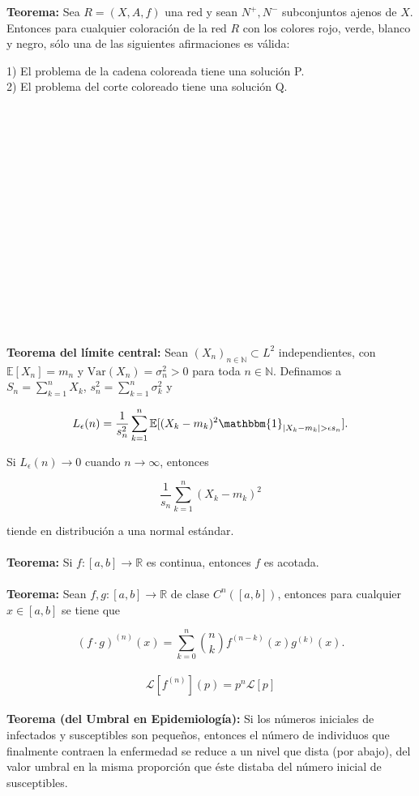 \documentclass[a4paper,11pt, twocolumn]{article}
\newcommand{\NN}{\mathbb{N}}
\newcommand{\EE}{\mathbb{E}}
\newcommand{\RR}{\mathbb{R}}
\newcommand{\Ll}{\mathcal{L}}
\newcommand{\1}{\mathbbm{1}}
\begin{document}
\textbf{Teorema:} Sea $R=(X,A,f)$ una red y sean $N^+,N^-$ subconjuntos ajenos de $X$. Entonces para cualquier coloración de la red $R$ con los colores rojo, verde, blanco y negro, sólo una de las siguientes afirmaciones es válida:

1) El problema de la cadena coloreada tiene una solución P.\\
2) El problema del corte coloreado tiene una solución Q.\\\\\\\\\\\\\\\\\\\\\\\\\\\\\\\


\textbf{Teorema del límite central:} Sean $(X_n)_{n\in\NN}\subset L^2$ independientes, con $\EE[X_n]=m_n$ y $\mathrm{Var}(X_n)=\sigma_n^2>0$ para toda $n\in\NN$. Definamos a $S_n = \sum_{k=1}^n X_k$, $s_n^2 = \sum_{k=1}^n \sigma^2_k$ y  

\[L_\epsilon (n) = \dfrac{1}{s_n^2}\sum_{k=1}^n\EE[(X_k-m_k)^2\1_{|X_k-m_k|>\epsilon s_n}].\]

Si $L_\epsilon (n)\rightarrow 0$ cuando $n\to \infty$, entonces

\[\dfrac{1}{s_n}\sum_{k=1}^n(X_k-m_k)^2\]

tiende en distribución a una normal estándar.\\\\

\textbf{Teorema:} Si $f:[a,b]\to \RR$ es continua, entonces $f$ es acotada.\\\\

\textbf{Teorema:} Sean $f,g:[a,b]\to \RR$ de clase $C^n([a,b])$, entonces para cualquier $x\in[a,b]$ se tiene que

\[(f\cdot g)^{(n)}(x)=\sum_{k=0}^n\binom{n}{k}f^{(n-k)}(x)g^{(k)}(x).\]\\



\[\Ll\left[f^{(n)}\right](p)=p^n\Ll[p]\]\\

\textbf{Teorema (del Umbral en Epidemiología):} Si los números iniciales de infectados y susceptibles son pequeños, entonces el número de individuos que finalmente contraen la enfermedad se reduce a un nivel que dista (por abajo), del valor umbral en la misma proporción que éste distaba del número inicial de susceptibles.\\\\
\end{document}
